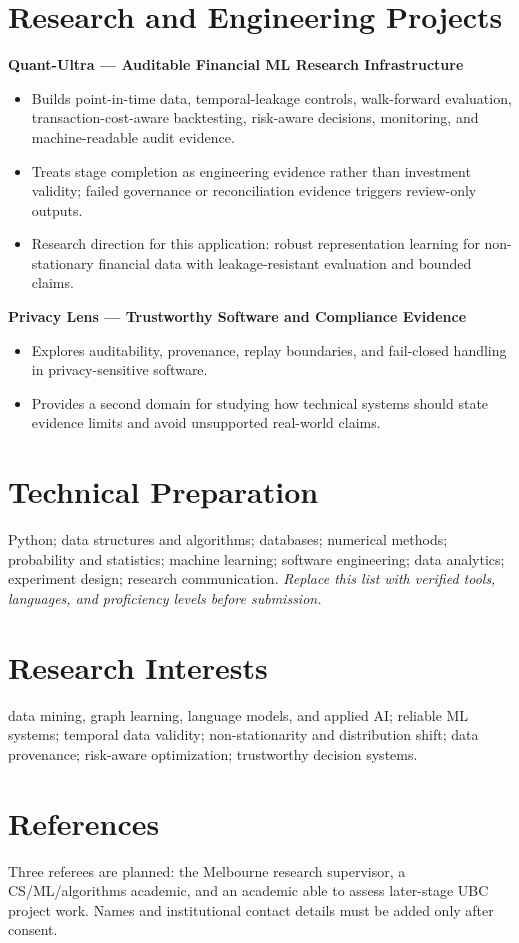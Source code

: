 \documentclass[11pt]{article}
\begin{document}
\section*{Research and Engineering Projects}
\textbf{Quant-Ultra --- Auditable Financial ML Research Infrastructure}
\begin{itemize}
\item Builds point-in-time data, temporal-leakage controls, walk-forward evaluation, transaction-cost-aware backtesting, risk-aware decisions, monitoring, and machine-readable audit evidence.
\item Treats stage completion as engineering evidence rather than investment validity; failed governance or reconciliation evidence triggers review-only outputs.
\item Research direction for this application: robust representation learning for non-stationary financial data with leakage-resistant evaluation and bounded claims.
\end{itemize}

\begin{samepage}
\textbf{Privacy Lens --- Trustworthy Software and Compliance Evidence}
\begin{itemize}
\item Explores auditability, provenance, replay boundaries, and fail-closed handling in privacy-sensitive software.
\item Provides a second domain for studying how technical systems should state evidence limits and avoid unsupported real-world claims.
\end{itemize}
\end{samepage}

\section*{Technical Preparation}
Python; data structures and algorithms; databases; numerical methods; probability and statistics; machine learning; software engineering; data analytics; experiment design; research communication. \textit{Replace this list with verified tools, languages, and proficiency levels before submission.}

\section*{Research Interests}
data mining, graph learning, language models, and applied AI; reliable ML systems; temporal data validity; non-stationarity and distribution shift; data provenance; risk-aware optimization; trustworthy decision systems.

\section*{References}
Three referees are planned: the Melbourne research supervisor, a CS/ML/algorithms academic, and an academic able to assess later-stage UBC project work. Names and institutional contact details must be added only after consent.
\end{document}
